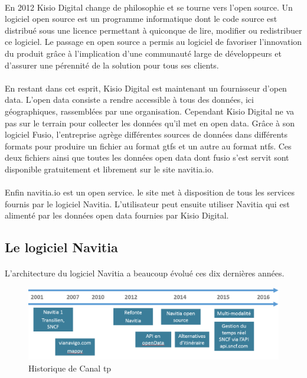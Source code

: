 \documentclass[a4paper]{report}
\begin{document}
\paragraph{} En 2012 Kisio Digital change de philosophie et se tourne vers l'open source. Un logiciel open source est un programme informatique dont le code source est distribué sous une licence permettant à quiconque de lire, modifier ou redistribuer ce logiciel. Le passage en open source a permis au logiciel de favoriser l’innovation du produit grâce à l’implication d’une communauté large de développeurs et d'assurer une pérennité de la solution pour tous ses clients. 

\paragraph{} En restant dans cet esprit, Kisio Digital est maintenant un fournisseur d'open data. L'open data consiste a rendre accessible à tous des données, ici géographiques, rassemblées par une organisation. Cependant Kisio Digital ne va pas sur le terrain pour collecter les données qu'il met en open data. Grâce à son logiciel Fusio, l'entreprise agrège différentes sources de données dans différents formats pour produire un fichier au format gtfs et un autre au format ntfs. Ces deux fichiers ainsi que toutes les données open data dont fusio s'est servit sont disponible gratuitement et librement sur le site navitia.io.

\paragraph{} Enfin navitia.io est un open service. le site met à disposition de tous les services fournis par le logiciel Navitia. L'utilisateur peut ensuite utiliser Navitia qui est alimenté par les données open data fournies par Kisio Digital. 

\subsection{Le logiciel Navitia}

\paragraph{} L'architecture du logiciel Navitia a beaucoup évolué ces dix dernières années.

\begin{figure}[H]
	\begin{center}
		\includegraphics[width=400pt]{image/historique_navitia}
		\caption{Historique de Canal tp}
		\label{Historique de Canal tp}
	\end{center}
\end{figure}
\end{document}
